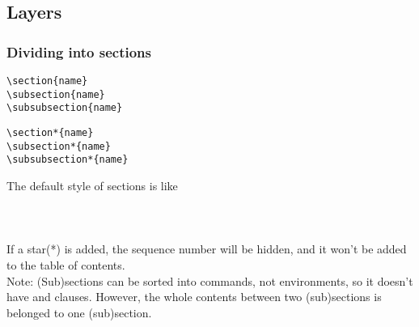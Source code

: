 \subsection{Layers}

\begin{frame}[fragile]
	\frametitle{Dividing into sections}
	\begin{command}
		\begin{multicols}{2}
			\begin{verbatim}
\section{name}
\subsection{name}
\subsubsection{name}
			\end{verbatim}
			\begin{verbatim}
\section*{name}
\subsection*{name}
\subsubsection*{name}
			\end{verbatim}
		\end{multicols}
		\vspace{-0.5em}
	\end{command}
	The default style of sections is like\\
	\\
	\\
	\\[0.5em]
	If a star(\alert{*}) is added, the sequence number will be hidden, and it won't be added to the table of contents.\\
	\alert{Note:} (Sub)sections can be sorted into commands, not environments, so it doesn't have \LC{\begin} and \LC{\end} clauses. However, the whole contents between two (sub)sections is belonged to one (sub)section.
\end{frame}

